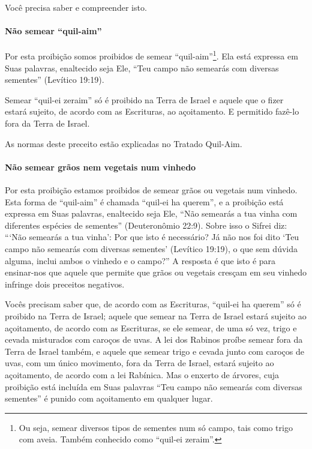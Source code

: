 Você precisa saber e compreender isto.

\paragraph{Não semear ``quil-aim''}

Por esta proibição somos proibidos de semear
``quil-aim''\footnote{Ou seja, semear diversos tipos de sementes num só campo, tais como
  trigo com aveia. Também conhecido como ``quil-ei
  zeraim''.}. Ela está expressa em Suas palavras,
enaltecido seja Ele, ``Teu campo não semearás com diversas sementes''
(Levítico 19:19).

Semear ``quil-ei zeraim'' só é proibido na Terra de Israel e aquele que
o fizer estará sujeito, de acordo com as Escrituras, ao açoitamento. E
permitido fazê-lo fora da Terra de Israel.

As normas deste preceito estão explicadas no Tratado Quil-Aim.

\paragraph{Não semear grãos nem vegetais num vinhedo}

Por esta proibição estamos proibidos de semear grãos ou vegetais num
vinhedo. Esta forma de ``quil-aim'' é chamada ``quil-ei ha querem'', e a
proibição está expressa em Suas palavras, enaltecido seja Ele, ``Não
semearás a tua vinha com diferentes espécies de sementes'' (Deuteronômio
22:9). Sobre isso o Sifrei diz: ```Não semearás a tua vinha': Por que
isto é necessário? Já não nos foi dito `Teu campo não semearás com
diversas sementes' (Levítico 19:19), o que sem dúvida alguma, inclui
ambos o vinhedo e o campo?'' A resposta é que isto é para ensinar-nos
que aquele que permite que grãos ou vegetais cresçam em seu vinhedo
infringe dois preceitos negativos.

Vocês precisam saber que, de acordo com as Escrituras, ``quil-ei ha
querem'' só é proibido na Terra de Israel; aquele que semear na Terra de
Israel estará sujeito ao açoitamento, de acordo com as Escrituras, se
ele semear, de uma só vez, trigo e cevada misturados com caroços de
uvas. A lei dos Rabinos proíbe semear fora da Terra de Israel também, e
aquele que semear trigo e cevada junto com caroços de uvas, com um
único movimento, fora da Terra de Israel, estará sujeito ao açoitamento,
de acordo com a lei Rabínica. Mas o enxerto de árvores, cuja proibição
está incluída em Suas palavras ``Teu campo não semearás com diversas
sementes'' é punido com açoitamento em qualquer lugar.

